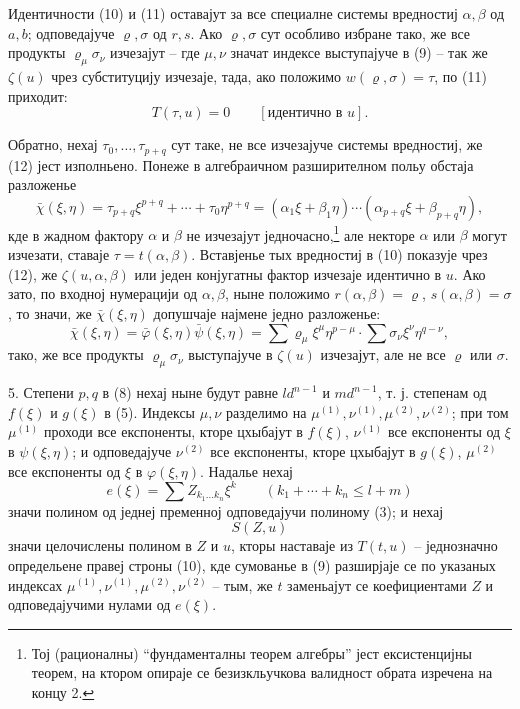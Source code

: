 ﻿\documentclass[11pt]{article}
\begin{document}
Идентичности (10) и (11) оставајут за все специалне системы вредностиј $\alpha,\beta$ од $a,b$; одповедајуче $\varrho,\sigma$ од $r,s$. Ако $\varrho,\sigma$ сут особливо избране тако, же все продукты $\varrho_\mu\sigma_\nu$ изчезајут -- где $\mu,\nu$ значат индексе выступајуче в (9) -- так же $\zeta(u)$ чрез субституцију изчезаје, тада, ако положимо $w(\varrho,\sigma)=\tau$, по (11) приходит:
\begin{equation}
 T(\tau,u)=0\qquad[\text{идентично в }u].
\tag{12}
\end{equation}

Обратно, нехај $\tau_0,\ldots,\tau_{p+q}$ сут таке, не все изчезајуче системы вредностиј, же (12) јест изполньено. Понеже в алгебраичном разширителном польу обстаја разложенье
\begin{equation}
 \bar\chi(\xi,\eta)=\tau_{p+q}\xi^{p+q}+\cdots+\tau_0\eta^{p+q}
=(\alpha_1\xi+\beta_1\eta)\cdots(\alpha_{p+q}\xi+\beta_{p+q}\eta),
\tag{12'}
\end{equation}
кде в жадном фактору $\alpha$ и $\beta$ не изчезајут једночасно,\footnote{Тој (рационалны) ``фундаменталны теорем алгебры'' јест ексистенцијны теорем, на ктором опираје се безизкльучкова валидност обрата изречена на концу 2.} але некторе $\alpha$ или $\beta$ могут изчезати, ставаје $\tau=t(\alpha,\beta)$. Вставјенье тых вредностиј в (10) показује чрез (12), же $\zeta(u,\alpha,\beta)$ или једен конјугатны фактор изчезаје идентично в $u$. Ако зато, по входној нумерацији од $\alpha,\beta$, ныне положимо $r(\alpha,\beta)=\varrho$, $s(\alpha,\beta)=\sigma$, то значи, же $\bar\chi(\xi,\eta)$ допушчаје најмене једно разложенье:
\begin{equation}
\bar\chi(\xi,\eta)=\bar\varphi(\xi,\eta)\bar\psi(\xi,\eta)
=\sum \varrho_\mu\xi^\mu\eta^{p-\mu}\cdot\sum \sigma_\nu\xi^\nu\eta^{q-\nu},
\tag{13}
\end{equation}
тако, же все продукты $\varrho_\mu\sigma_\nu$ выступајуче в $\zeta(u)$ изчезајут, але не все $\varrho$ или $\sigma$.

5. Степени $p,q$ в (8) нехај ныне будут равне $ld^{n-1}$ и $md^{n-1}$, т. ј. степенам од $f(\xi)$ и $g(\xi)$ в (5). Индексы $\mu,\nu$ разделимо на $\mu^{(1)},\nu^{(1)},\mu^{(2)},\nu^{(2)}$; при том $\mu^{(1)}$ проходи все експоненты, кторе цхыбајут в $f(\xi)$, $\nu^{(1)}$ все експоненты од $\xi$ в $\psi(\xi,\eta)$; и одповедајуче $\nu^{(2)}$ все експоненты, кторе цхыбајут в $g(\xi)$, $\mu^{(2)}$ все експоненты од $\xi$ в $\varphi(\xi,\eta)$. Надалье нехај
\[
 e(\xi)=\sum Z_{k_1\ldots k_n}\xi^k\qquad(k_1+\cdots+k_n\le l+m)
\]
значи полином од једнеј пременној одповедајучи полиному (3); и нехај
\[
 S(Z,u)
\]
значи целочислены полином в $Z$ и $u$, кторы наставаје из $T(t,u)$ -- једнозначно определьене правеј строны (10), кде сумованье в (9) разширјаје се по указаных индексах $\mu^{(1)},\nu^{(1)},\mu^{(2)},\nu^{(2)}$ -- тым, же $t$ заменьајут се коефициентами $Z$ и одповедајучими нулами од $e(\xi)$.
\end{document}
